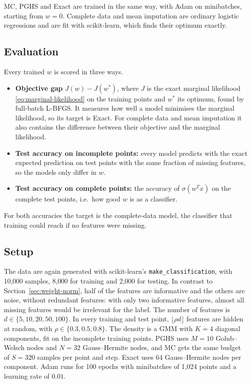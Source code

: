 MC, PGHS and Exact are trained in the same way, with Adam on minibatches,
starting from $w = 0$. Complete data and mean imputation are ordinary logistic
regressions and are fit with scikit-learn, which finds their optimum exactly.

\subsection{Evaluation}
\label{subsec:training-evaluation}

Every trained $w$ is scored in three ways.
\begin{itemize}
  \item \textbf{Objective gap} $J(w) - J(w^*)$, where $J$ is the exact marginal
        likelihood \eqref{eq:marginal-likelihood} on the training points and
        $w^*$ its optimum, found by full-batch L-BFGS. It measures how well a model
        minimises the marginal likelihood, so its target is Exact. For complete
        data and mean imputation it also contains the difference between their
        objective and the marginal likelihood.
  \item \textbf{Test accuracy on incomplete points:} every model predicts with the
        exact expected prediction on test points with the same fraction of
        missing features, so the models only differ in $w$.
  \item \textbf{Test accuracy on complete points:} the accuracy of
        $\sigma(w^T x)$ on the complete test points, i.e.\ how good $w$ is as a
        classifier.
\end{itemize}
For both accuracies the target is the complete-data model, the classifier that
training could reach if no features were missing.

\subsection{Setup}
\label{subsec:training-setup}

The data are again generated with scikit-learn's \texttt{make\_classification}, with
10{,}000 samples, 8{,}000 for training and 2{,}000 for testing. In contrast to
Section~\ref{sec:weight-norm}, half of the features are informative and the
others are noise, without redundant features: with only two informative
features, almost all missing features would be irrelevant for the label. The
number of features is $d \in \{5, 10, 20, 50, 100\}$. In every training and test
point, $\lfloor \rho d \rfloor$ features are hidden at random, with
$\rho \in \{0.3, 0.5, 0.8\}$. The density is a GMM with $K = 4$ diagonal
components, fit on the incomplete training points. PGHS uses $M = 10$
Golub--Welsch nodes and $N = 32$ Gauss--Hermite nodes, and MC gets the same
budget of $S = 320$ samples per point and step. Exact uses 64 Gauss--Hermite
nodes per component. Adam runs for 100 epochs with minibatches of 1{,}024 points
and a learning rate of $0.01$.

